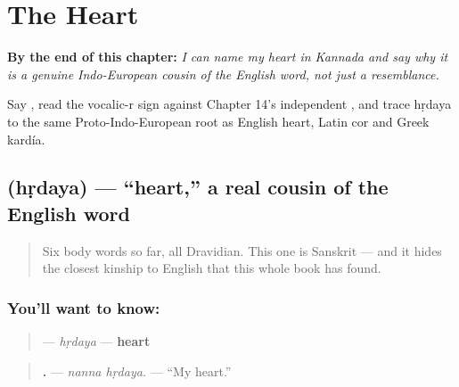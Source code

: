 
\chapter{The Heart}
\label{ch:ka-heart}

\begin{chapteropening}
\textbf{By the end of this chapter:} \emph{I can name my heart in Kannada and say why it is a genuine Indo-European cousin of the English word, not just a resemblance.}

Say  , read the vocalic-r sign  against Chapter 14's independent , and trace hṛdaya to the same Proto-Indo-European root as English heart, Latin cor and Greek kardía.
\end{chapteropening}

\section[\texorpdfstring{\kn{ಹೃದಯ} (hṛdaya)}{ಹೃದಯ (hṛdaya)}]{ (hṛdaya) — \textquotedblleft{}heart,\textquotedblright{} a real cousin of the English word}

\label{lesson:KA-C38-hrudaya}



\begin{quote}
Six body words so far, all Dravidian. This one is Sanskrit — and it hides the closest kinship to English that this whole book has found.
\end{quote}

\subsection*{You'll want to know: }
\begin{quote}
\textbf{} — \emph{hṛdaya} — \textbf{heart}
\end{quote}

\begin{quote}
\textbf{ .} — \emph{nanna hṛdaya.} — \textquotedblleft{}My heart.\textquotedblright{}
\end{quote}

